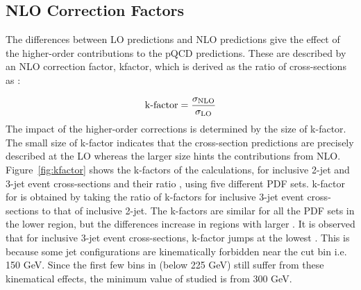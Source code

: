 \subsection{NLO Correction Factors}
\label{sec:nlo_factors}
The differences between LO predictions and NLO predictions give the effect of the higher-order contributions to the pQCD predictions. These are described by an NLO correction factor, k\hy factor, which is derived as the ratio of cross-sections as :

\begin{equation}
\label{eq:kfactors}
 {\rm k\hy factor} = \frac{\sigma_{\rm NLO}}{\sigma_{\rm LO}}
\end{equation}
The impact of the higher-order corrections is determined by the size of k-factor. The small size of k-factor indicates that the cross-section predictions are precisely described at the LO whereas the larger size hints the contributions from NLO. Figure~\ref{fig:kfactor} shows the k-factors of the \NLOJETPP calculations, for inclusive 2-jet and 3-jet event cross-sections and their ratio \ratio, using five different PDF sets. k-factor for \ratio is obtained by taking the ratio of k-factors for inclusive 3-jet event cross-sections to that of inclusive 2-jet. The k-factors are similar for all the PDF sets in the lower region, but the differences increase in regions with larger \httwo. It is observed that for inclusive 3-jet event cross-sections, k-factor jumps at the lowest \httwo. This is because some jet configurations are kinematically forbidden near the \pt cut bin i.e. 150 GeV. Since the first few bins in \httwo (below 225 GeV) still suffer from these kinematical effects, the minimum value of \httwo studied is from 300 GeV.

